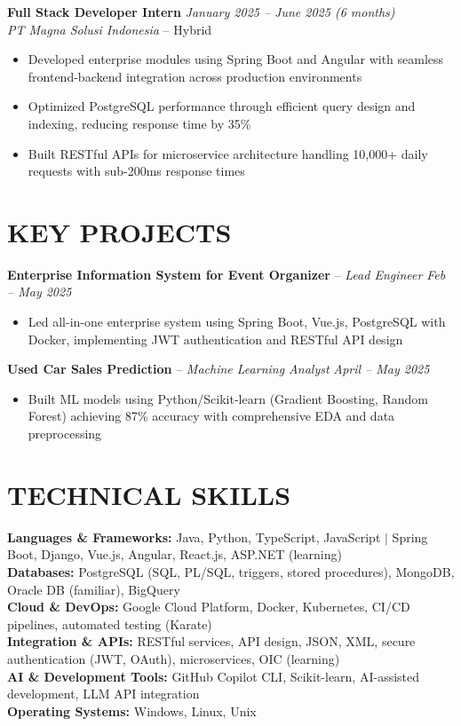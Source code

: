 \documentclass[10pt,a4paper]{article}
\begin{document}
\textbf{Full Stack Developer Intern} \hfill \textit{January 2025 – June 2025 (6 months)} \\
\textit{PT Magna Solusi Indonesia} – Hybrid \\[-6pt]
\begin{itemize}
    \item Developed enterprise modules using Spring Boot and Angular with seamless frontend-backend integration across production environments
    \item Optimized PostgreSQL performance through efficient query design and indexing, reducing response time by 35\%
    \item Built RESTful APIs for microservice architecture handling 10,000+ daily requests with sub-200ms response times
\end{itemize}

\section*{KEY PROJECTS}
\vspace{-2pt}

\textbf{Enterprise Information System for Event Organizer} – \textit{Lead Engineer} \hfill \textit{Feb – May 2025} \\[-6pt]
\begin{itemize}
    \item Led all-in-one enterprise system using Spring Boot, Vue.js, PostgreSQL with Docker, implementing JWT authentication and RESTful API design
\end{itemize}

\textbf{Used Car Sales Prediction} – \textit{Machine Learning Analyst} \hfill \textit{April – May 2025} \\[-6pt]
\begin{itemize}
    \item Built ML models using Python/Scikit-learn (Gradient Boosting, Random Forest) achieving 87\% accuracy with comprehensive EDA and data preprocessing
\end{itemize}

\section*{TECHNICAL SKILLS}
\vspace{-2pt}
\textbf{Languages \& Frameworks:} Java, Python, TypeScript, JavaScript $|$ Spring Boot, Django, Vue.js, Angular, React.js, ASP.NET (learning) \\
\textbf{Databases:} PostgreSQL (SQL, PL/SQL, triggers, stored procedures), MongoDB, Oracle DB (familiar), BigQuery \\
\textbf{Cloud \& DevOps:} Google Cloud Platform, Docker, Kubernetes, CI/CD pipelines, automated testing (Karate) \\
\textbf{Integration \& APIs:} RESTful services, API design, JSON, XML, secure authentication (JWT, OAuth), microservices, OIC (learning) \\
\textbf{AI \& Development Tools:} GitHub Copilot CLI, Scikit-learn, AI-assisted development, LLM API integration \\
\textbf{Operating Systems:} Windows, Linux, Unix
\end{document}
